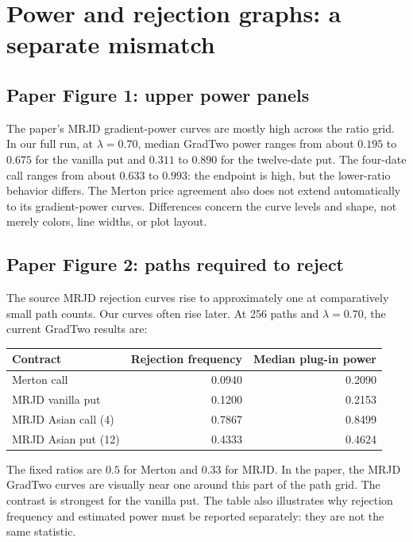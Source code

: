 \documentclass[11pt,a4paper]{article}
\begin{document}
\clearpage
\section{Power and rejection graphs: a separate mismatch}
\subsection{Paper Figure 1: upper power panels}
The paper's MRJD gradient-power curves are mostly high across the ratio
grid. In our full run, at $\lambda=0.70$, median GradTwo power ranges
from about $0.195$ to $0.675$ for the vanilla put and $0.311$ to $0.890$
for the twelve-date put. The four-date call ranges from about $0.633$
to $0.993$: the endpoint is high, but the lower-ratio behavior differs.
The Merton price agreement also does not extend automatically to its
gradient-power curves. Differences concern the curve levels and shape,
not merely colors, line widths, or plot layout.

\subsection{Paper Figure 2: paths required to reject}
The source MRJD rejection curves rise to approximately one at comparatively
small path counts. Our curves often rise later. At 256 paths and
$\lambda=0.70$, the current GradTwo results are:
\begin{center}\small
\begin{tabular}{@{}lrr@{}}
\toprule
Contract & Rejection frequency & Median plug-in power\\
\midrule
Merton call & 0.0940 & 0.2090 \\
MRJD vanilla put & 0.1200 & 0.2153 \\
MRJD Asian call (4) & 0.7867 & 0.8499 \\
MRJD Asian put (12) & 0.4333 & 0.4624 \\
\bottomrule
\end{tabular}
\end{center}
The fixed ratios are $0.5$ for Merton and $0.33$ for MRJD. In the paper,
the MRJD GradTwo curves are visually near one around this part of the
path grid. The contrast is strongest for the vanilla put. The table
also illustrates why rejection frequency and estimated power must be
reported separately: they are not the same statistic.
\end{document}
